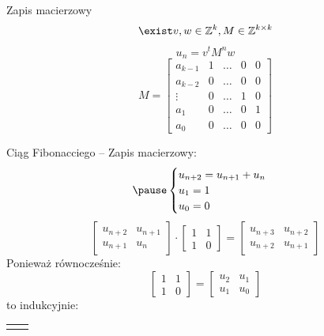 \documentclass[handout]{beamer}
\theoremstyle{definition}
\theoremstyle{named}
\begin{document}
\begin{frame}{Zapis macierzowy}
    $$\exist v, w \in \mathbb{Z}^{k}, M \in \mathbb{Z}^{k\times k} $$
    \pause
    $$u_n = v^{t}M^{n}w$$
    \pause
   $$
        M = \begin{bmatrix}
        a_{k-1} & 1 & \ldots & 0 & 0 \\
        a_{k-2} & 0 & \ldots & 0 & 0 \\
        \vdots & 0 & \ldots & 1 & 0 \\ 
        a_1 & 0 & \ldots & 0 & 1 \\
        a_0 & 0 & \ldots & 0 & 0
        \end{bmatrix}
   $$
\end{frame}

\begin{frame}{Ciąg Fibonacciego -- Zapis macierzowy:}
\begin{equation*}
\pause
\begin{cases}
u_{n+2} = u_{n+1} + u_n \\
u_{1} = 1 \\
u_{0} = 0 
\end{cases}
\end{equation*}
\pause
\begin{equation*}
        \begin{bmatrix}
        u_{n+2} & u_{n+1} \\
        u_{n+1} & u_{n} 
        \end{bmatrix} 
        \cdot
        \begin{bmatrix}
        1 & 1\\
        1 & 0
        \end{bmatrix}
        = 
        \begin{bmatrix}
        u_{n+3} & u_{n+2}\\
        u_{n+2} & u_{n+1}
        \end{bmatrix}
\end{equation*}
\pause
Ponieważ równocześnie:
\begin{equation*}
    \begin{bmatrix}
    1 & 1 \\
    1 & 0 
    \end{bmatrix}= 
    \begin{bmatrix}
    u_2 & u_1 \\
    u_1 & u_0
    
    \end{bmatrix}
\end{equation*}
\pause
to indukcyjnie: 
\begin{table}[]
    \centering
    \begin{tabular}{c|c}
       \begin{equation*}
    

\end{equation*}
\end{tabular}
\end{table}
\end{frame}
\end{document}
